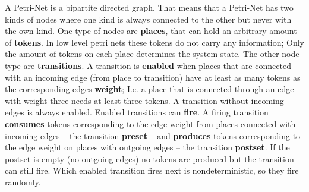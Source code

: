 A Petri-Net is a bipartite directed graph.
That means that a Petri-Net has two kinds of nodes where one kind is always connected to the other but never with the own kind.
One type of nodes are \textbf{places}, that can hold an arbitrary amount of \textbf{tokens}.
In low level petri nets these tokens do not carry any information; 
Only the amount of tokens on each place determines the system state.
The other node type are \textbf{transitions}.
A transition is \textbf{enabled} when places that are connected with an incoming edge (from place to transition) have at least as many tokens as the corresponding edges \textbf{weight};
I.e. a place that is connected through an edge with weight three needs at least three tokens.
A transition without incoming edges is always enabled.
Enabled transitions can \textbf{fire}.
A firing transition \textbf{consumes} tokens corresponding to the edge weight from places connected with incoming edges -- the transition \textbf{preset} -- and \textbf{produces} tokens corresponding to the edge weight on places with outgoing edges -- the transition \textbf{postset}.
If the postset is empty (no outgoing edges) no tokens are produced but the transition can still fire.
Which enabled transition fires next is nondeterministic, so they fire randomly.

